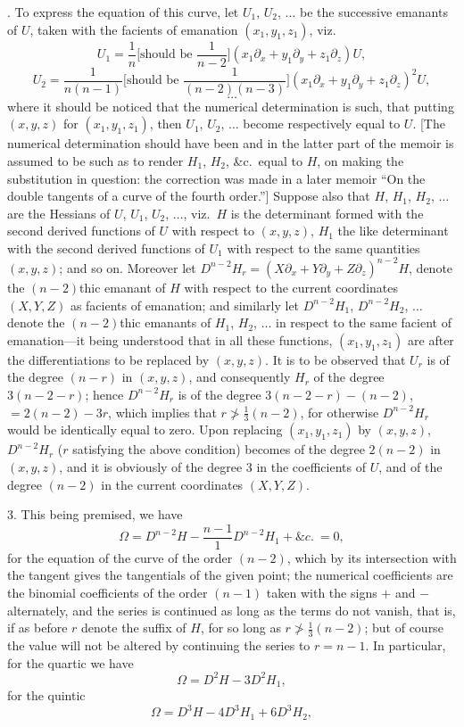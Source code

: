 \documentclass[11pt]{article}
\begin{document}
\medskip

. To express the equation of this curve, let $U_1$, $U_2$, $\ldots$ be the successive emanants of $U$, taken with the facients of emanation $(x_1, y_1, z_1)$, viz.
\[
U_1 = \frac{1}{n}\bigg[\text{should be } \frac{1}{n-2}\bigg](x_1\partial_x + y_1\partial_y + z_1\partial_z)U,
\]
\[
U_2 = \frac{1}{n(n-1)}\bigg[\text{should be } \frac{1}{(n-2)(n-3)}\bigg](x_1\partial_x + y_1\partial_y + z_1\partial_z)^2 U,
\]
\[
\ldots
\]
where it should be noticed that the numerical determination is such, that putting $(x, y, z)$ for $(x_1, y_1, z_1)$, then $U_1$, $U_2$, $\ldots$ become respectively equal to $U$. [The numerical determination should have been and in the latter part of the memoir is assumed to be such as to render $H_1$, $H_2$, \&c.\ equal to $H$, on making the substitution in question: the correction was made in a later memoir ``On the double tangents of a curve of the fourth order.''] Suppose also that $H$, $H_1$, $H_2$, $\ldots$ are the Hessians of $U$, $U_1$, $U_2$, $\ldots$, viz.\ $H$ is the determinant formed with the second derived functions of $U$ with respect to $(x, y, z)$, $H_1$ the like determinant with the second derived functions of $U_1$ with respect to the same quantities $(x, y, z)$; and so on. Moreover let $D^{n-2}H_r = (X\partial_x + Y\partial_y + Z\partial_z)^{n-2}H$, denote the $(n-2)$thic emanant of $H$ with respect to the current coordinates $(X, Y, Z)$ as facients of emanation; and similarly let $D^{n-2}H_1$, $D^{n-2}H_2$, $\ldots$ denote the $(n-2)$thic emanants of $H_1$, $H_2$, $\ldots$ in respect to the same facient of emanation---it being understood that in all these functions, $(x_1, y_1, z_1)$ are after the differentiations to be replaced by $(x, y, z)$. It is to be observed that $U_r$ is of the degree $(n-r)$ in $(x, y, z)$, and consequently $H_r$ of the degree $3(n-2-r)$; hence $D^{n-2}H_r$ is of the degree $3(n-2-r)-(n-2)$, $= 2(n-2)-3r$, which implies that $r \not> \tfrac{1}{3}(n-2)$, for otherwise $D^{n-2}H_r$ would be identically equal to zero. Upon replacing $(x_1, y_1, z_1)$ by $(x, y, z)$, $D^{n-2}H_r$ ($r$ satisfying the above condition) becomes of the degree $2(n-2)$ in $(x, y, z)$, and it is obviously of the degree 3 in the coefficients of $U$, and of the degree $(n-2)$ in the current coordinates $(X, Y, Z)$.

\medskip

3. This being premised, we have
\[
\Omega = D^{n-2}H - \frac{n-1}{1}D^{n-2}H_1 + \&c.\ = 0,
\]
for the equation of the curve of the order $(n-2)$, which by its intersection with the tangent gives the tangentials of the given point; the numerical coefficients are the binomial coefficients of the order $(n-1)$ taken with the signs $+$ and $-$ alternately, and the series is continued as long as the terms do not vanish, that is, if as before $r$ denote the suffix of $H$, for so long as $r \not> \tfrac{1}{3}(n-2)$; but of course the value will not be altered by continuing the series to $r = n - 1$. In particular, for the quartic we have
\[
\Omega = D^2H - 3D^2H_1,
\]
for the quintic
\[
\Omega = D^3H - 4D^3H_1 + 6D^3H_2,
\]
\end{document}
